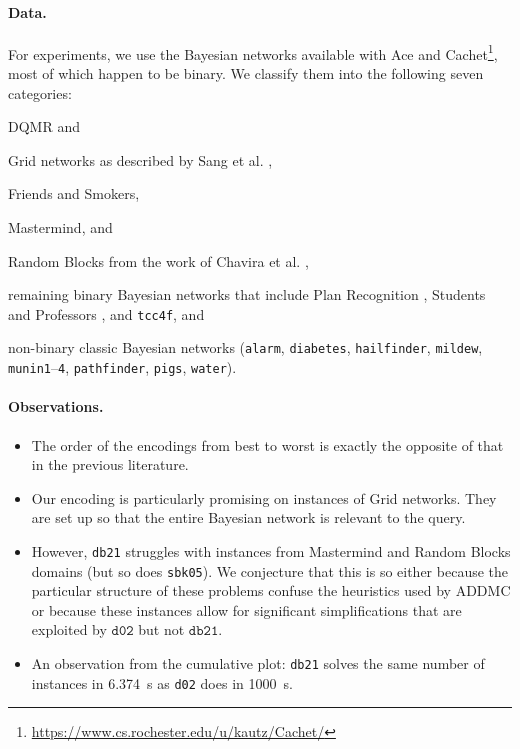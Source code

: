 \documentclass{article}
\theoremstyle{definition}
\theoremstyle{remark}
\begin{document}
{\paragraph{Data.} For experiments, we use the Bayesian networks available
with Ace and
Cachet\footnote{\url{https://www.cs.rochester.edu/u/kautz/Cachet/}}, most of
which happen to be binary. We classify them into the following seven categories:
\begin{itemize*}
\item DQMR and
\item Grid networks as described by Sang et al. \cite{DBLP:conf/aaai/SangBK05},
\item Friends and Smokers,
\item Mastermind, and
\item Random Blocks from the work of Chavira et al.
  \cite{DBLP:journals/ijar/ChaviraDJ06},
\item remaining binary Bayesian networks that include Plan Recognition
  \cite{DBLP:conf/aaai/SangBK05}, Students and Professors
  \cite{DBLP:journals/ijar/ChaviraDJ06}, and \texttt{tcc4f}, and
\item non-binary classic Bayesian networks (\texttt{alarm}, \texttt{diabetes},
  \texttt{hailfinder}, \texttt{mildew}, \texttt{munin1}--\texttt{4},
  \texttt{pathfinder}, \texttt{pigs}, \texttt{water}).
\end{itemize*}

\paragraph{Observations.}
\begin{itemize}
\item The order of the encodings from best to worst is exactly the opposite of
  that in the previous literature.
\item Our encoding is particularly promising on instances of Grid networks.
  They are set up so that the entire Bayesian network is relevant to the
  query.
\item However, \texttt{db21} struggles with instances from Mastermind and
  Random Blocks domains (but so does \texttt{sbk05}). We conjecture that this
  is so either because the particular structure of these problems confuse the
  heuristics used by ADDMC or because these instances allow for significant
  simplifications that are exploited by $\mathtt{d02}$ but not
  $\mathtt{db21}$.
\item An observation from the cumulative plot: \texttt{db21} solves the same
  number of instances in \SI{6.374}{\second} as \texttt{d02} does in
  \SI{1000}{\second}.
\end{itemize}

}
\end{document}
